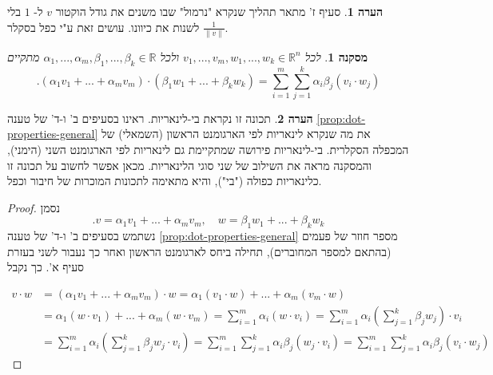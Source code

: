 \documentclass[12pt]{report}
\theoremstyle{plain}
\newtheorem{corollary}[theorem]{מסקנה}
\theoremstyle{definition}
\newtheorem{remark}{הערה}[chapter]
\newcommand{\R}{\mathbb{R}}
\newcommand{\0}{\mathbf{0}}
\begin{document}
\begin{remark}
סעיף ז' מתאר תהליך שנקרא "נרמול" שבו משנים את גודל הוקטור 
$v$
ל-
$1$
בלי לשנות את כיוונו. עושים זאת ע"י כפל בסקלר 
$\frac{1}{\|v\|}$.
\end{remark}

\begin{corollary}\label{cor:bilinear}
לכל
$v_1,...,v_m,w_1,...,w_k\in\R^n$
ולכל
$\alpha_1,...,\alpha_m,\beta_1,...,\beta_k\in\R$
מתקיים
$$
.(\alpha_1v_1+...+\alpha_mv_m)\cdot(\beta_1w_1+...+\beta_kw_k)=\sum_{i=1}^m\sum_{j=1}^k\alpha_i\beta_j(v_i\cdot w_j)
$$
\end{corollary}

\begin{remark}
תכונה זו נקראת בי-לינאריות. ראינו בסעיפים ב' ו-ד' של טענה
\ref{prop:dot-properties-general}
את מה שנקרא לינאריות לפי הארגומנט הראשון (השמאלי) של המכפלה הסקלרית. בי-לינאריות פירושה שמתקיימת גם לינאריות לפי הארגומנט השני (הימני), והמסקנה מראה את השילוב של שני סוגי הלינאריות. מכאן אפשר לחשוב על תכונה זו כלינאריות כפולה ("בי"), והיא מתאימה לתכונות המוכרות של חיבור וכפל.
\end{remark}

\begin{proof}
נסמן
$$
.v=\alpha_1v_1+...+\alpha_mv_m, \quad w=\beta_1w_1+...+\beta_kw_k
$$
נשתמש בסעיפים ב' ו-ד' של טענה
\ref{prop:dot-properties-general}
מספר חוזר של פעמים (בהתאם למספר המחוברים), תחילה ביחס לארגומנט הראשון ואחר כך נעבור לשני בעזרת סעיף א'. כך נקבל

$$
\begin{aligned}
v\cdot w&=(\alpha_1v_1+...+\alpha_mv_m)\cdot w=\alpha_1(v_1\cdot w)+...+\alpha_m(v_m\cdot w) \\
&=\alpha_1(w\cdot v_1)+...+\alpha_m(w\cdot v_m)=\sum_{i=1}^m\alpha_i (w\cdot v_i)=\sum_{i=1}^m\alpha_i\left(\sum_{j=1}^k\beta_jw_j\right)\cdot v_i \\
&=\sum_{i=1}^m\alpha_i\left(\sum_{j=1}^k\beta_jw_j\cdot v_i\right)=\sum_{i=1}^m\sum_{j=1}^k \alpha_i\beta_j(w_j\cdot v_i)=\sum_{i=1}^m\sum_{j=1}^k \alpha_i\beta_j(v_i\cdot w_j)
\end{aligned}
$$
\end{proof}
\end{document}

